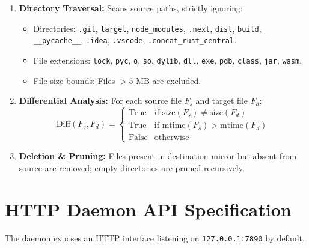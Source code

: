 \documentclass[11pt,a4paper]{article}
\begin{document}
\begin{enumerate}[leftmargin=*]
    \item \textbf{Directory Traversal:} Scans source paths, strictly ignoring:
    \begin{itemize}
        \item Directories: \texttt{.git}, \texttt{target}, \texttt{node\_modules}, \texttt{.next}, \texttt{dist}, \texttt{build}, \texttt{\_\_pycache\_\_}, \texttt{.idea}, \texttt{.vscode}, \texttt{.concat\_rust\_central}.
        \item File extensions: \texttt{lock}, \texttt{pyc}, \texttt{o}, \texttt{so}, \texttt{dylib}, \texttt{dll}, \texttt{exe}, \texttt{pdb}, \texttt{class}, \texttt{jar}, \texttt{wasm}.
        \item File size bounds: Files $> 5\text{ MB}$ are excluded.
    \end{itemize}
    \item \textbf{Differential Analysis:} For each source file $F_s$ and target file $F_d$:
    \begin{equation}
    \text{Diff}(F_s, F_d) = \begin{cases}
    \text{True} & \text{if } \text{size}(F_s) \neq \text{size}(F_d) \\
    \text{True} & \text{if } \text{mtime}(F_s) > \text{mtime}(F_d) \\
    \text{False} & \text{otherwise}
    \end{cases}
    \end{equation}
    \item \textbf{Deletion \& Pruning:} Files present in destination mirror but absent from source are removed; empty directories are pruned recursively.
\end{enumerate}

\section{HTTP Daemon API Specification}

The daemon exposes an HTTP interface listening on \texttt{127.0.0.1:7890} by default.
\end{document}

